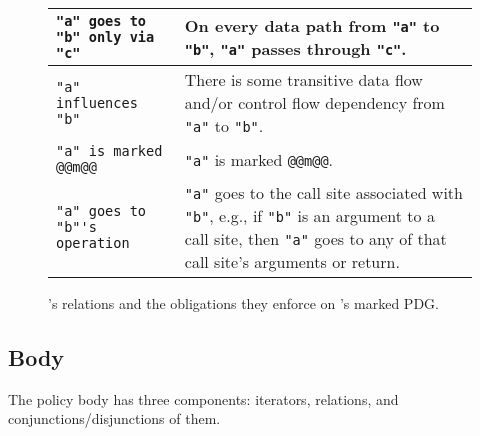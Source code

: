 \begin{figure}[t]
\begin{tabular}{|p{5.5cm}|p{8cm}|}
        \hline
        \lstinline[language=CNL]|"a" goes to "b" only via "c"|                    &  On every data path from \lstinline[language=CNL]|"a"| to \lstinline[language=CNL]|"b"|,
                                                                                    \lstinline[language=CNL]|"a"| passes through \lstinline[language=CNL]|"c"|. \\
        \hline
        \lstinline[language=CNL]|"a" influences "b"|                              &  There is some transitive data flow and/or control flow dependency from  \lstinline[language=CNL]|"a"| to \lstinline[language=CNL]|"b"|.  \\
        \hline
        \lstinline[language=CNL]|"a" is marked @@m@@|                             & \lstinline[language=CNL]|"a"| is marked \lstinline[language=CNL]|@@m@@|. \\
        \hline
        \lstinline[language=CNL]|"a" goes to "b"'s operation|                     & \lstinline[language=CNL]|"a"| goes to the call site associated with \lstinline[language=CNL]|"b"|,
                                                                                    e.g., if \lstinline[language=CNL]|"b"| is an argument to a call site, then \lstinline[language=CNL]|"a"| goes to any of that call site's arguments or return. \\        
      \hline
    \end{tabular}
      \caption{\syslang's relations and the obligations they enforce on \sys's marked PDG.}
      \label{f:relations}
  \end{figure}

\subsection{Body}
\label{sec:body}

The policy body has three components: iterators, relations, and conjunctions/disjunctions of them.
%

